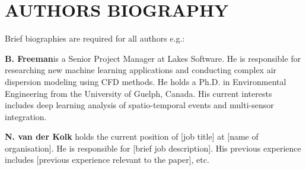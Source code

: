 \documentclass[twoside,twocolumn]{article}
\begin{document}
	\section{AUTHORS BIOGRAPHY}
	
	Brief biographies are required for all authors e.g.:
	
	\textbf{B. Freeman}is a Senior Project Manager at Lakes Software.  He is responsible for researching new machine learning applications and conducting complex air dispersion modeling using CFD methods.  He holds a Ph.D. in Environmental Engineering from the University of Guelph, Canada. His current interests includes deep learning analysis of spatio-temporal events and multi-sensor integration.
	
	\textbf{N. van der Kolk} holds the current position of [job title] at [name of organisation].  He is responsible for [brief job description].  His previous experience includes [previous experience relevant to the paper], etc.
	
	
	
\end{document}
